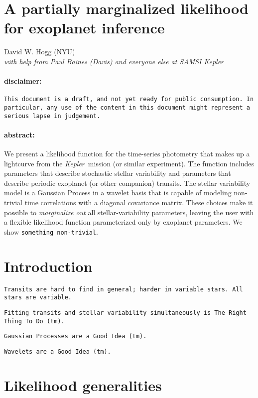 \documentclass[12pt,letterpaper]{article}
\newcommand{\warning}[1]{\texttt{#1}}
\newcommand{\project}[1]{\textsl{#1}}
\newcommand{\Kepler}{\project{Kepler}}
\begin{document}
\sloppy\sloppypar

\section*{A partially marginalized likelihood\\
          for exoplanet inference}

\noindent
David W. Hogg (NYU) \\
\textit{with help from Paul Baines (Davis) and everyone else at SAMSI \Kepler}

\paragraph{disclaimer:}
\warning{This document is a draft, and not yet ready for public consumption.
In particular, any use of the content in this document might represent a serious lapse in judgement.}

\paragraph{abstract:}
We present a likelihood function for the time-series photometry
that makes up a lightcurve from the \Kepler\ mission (or similar experiment).
The function includes parameters that describe stochastic stellar variability
and parameters that describe periodic exoplanet (or other companion) transits.
The stellar variability model is a Gaussian Process in a wavelet basis
that is capable of modeling non-trivial time correlations with a diagonal covariance matrix.
These choices make it possible to \emph{marginalize out} all stellar-variability parameters,
leaving the user with a flexible likelihood function parameterized only by exoplanet parameters.
We show \warning{something non-trivial}.

\section{Introduction}

\warning{Transits are hard to find in general; harder in variable stars.  All stars are variable.}

\warning{Fitting transits and stellar variability simultaneously is The Right Thing To Do~(tm).}

\warning{Gaussian Processes are a Good Idea~(tm).}

\warning{Wavelets are a Good Idea~(tm).}

\section{Likelihood generalities}
\end{document}

